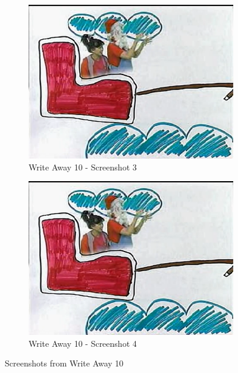 \begin{figure}[H]
    \begin{subfigure}{0.45\textwidth}
        \centering
        \includegraphics[width=\linewidth]{Games/WriteAway/Images/WriteAway10Screenshot1.png}
        \caption{Write Away 10 - Screenshot 3}
        \label{fig:sub3}
    \end{subfigure}
    \begin{subfigure}{0.45\textwidth}
        \centering
        \includegraphics[width=\linewidth]{Games/WriteAway/Images/WriteAway10Screenshot1.png}
        \caption{Write Away 10 - Screenshot 4}
        \label{fig:sub4}
    \end{subfigure}
    \caption{Screenshots from Write Away 10}
    \label{fig:all}
\end{figure}
